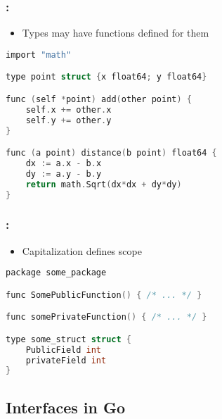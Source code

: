 \begin{frame}[fragile]
    \frametitle{\secname: \small\subsecname\normalsize}

    \begin{itemize}
        \item Types may have functions defined for them
    \end{itemize}


    \small \begin{lstlisting}[language=c]
import "math"

type point struct {x float64; y float64}

func (self *point) add(other point) {
    self.x += other.x
    self.y += other.y
}

func (a point) distance(b point) float64 {
    dx := a.x - b.x
    dy := a.y - b.y
    return math.Sqrt(dx*dx + dy*dy)
}
    \end{lstlisting} \normalsize
\end{frame}

\begin{frame}[fragile]
    \frametitle{\secname: \small\subsecname\normalsize}

    \begin{itemize}
        \item Capitalization defines scope
    \end{itemize}


    \small \begin{lstlisting}[language=c]
package some_package

func SomePublicFunction() { /* ... */ }

func somePrivateFunction() { /* ... */ }

type some_struct struct {
    PublicField int
    privateField int
}
    \end{lstlisting} \normalsize
\end{frame}

\subsection{Interfaces in Go}

